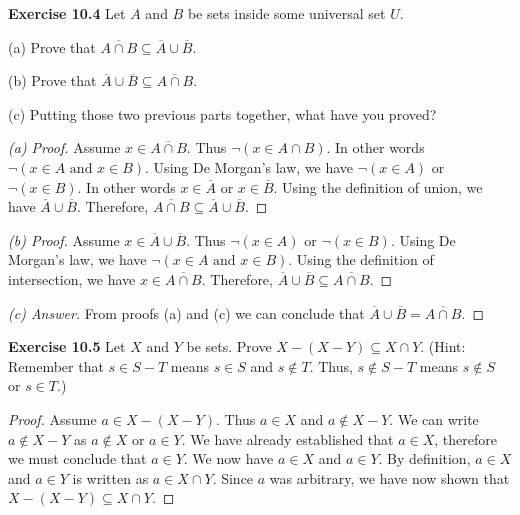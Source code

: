 \documentclass[12pt,oneside]{article}
\newenvironment{exercise}[1]{\vspace{.1in}\noindent\textbf{Exercise #1 \hspace{.05em}}}{}
\begin{document}

\begin{exercise}{10.4}
Let $A$ and $B$ be sets inside some universal set $U$.

(a) Prove that $\overline{A \cap B} \subseteq \overline{A} \cup \overline{B}$.

(b) Prove that $\overline{A} \cup \overline{B} \subseteq \overline{A \cap B}$.

(c) Putting those two previous parts together, what have you proved?
\end{exercise}

\begin{proof}[(a) Proof]
Assume $x \in \overline{A \cap B}$. Thus $\lnot (x \in A \cap B)$. In other words $\lnot (x \in A \text{ and } x \in B)$. Using De Morgan's law, we have $\lnot (x \in A)$ or $\lnot (x \in B)$. In other words $x \in \overline{A}$ or $x \in \overline{B}$. Using the definition of union, we have $\overline{A} \cup \overline{B}$. Therefore, $\overline{A \cap B} \subseteq \overline{A} \cup \overline{B}$.
\end{proof}

\begin{proof}[(b) Proof]
Assume $x \in \overline{A} \cup \overline{B}$. Thus $\lnot (x \in A)$ or $\lnot (x \in B)$. Using De Morgan's law, we have $\lnot (x \in A \text{ and } x \in B)$. Using the definition of intersection, we have $x \in \overline{A \cap B}$. Therefore, $\overline{A} \cup \overline{B} \subseteq \overline{A \cap B}$.
\end{proof}

\begin{proof}[(c) Answer]
From proofs (a) and (c) we can conclude that $\overline{A} \cup \overline{B} = \overline{A \cap B}$.
\end{proof}



\begin{exercise}{10.5}
Let $X$ and $Y$ be sets. Prove $X - (X - Y) \subseteq X \cap Y$. (Hint: Remember that $s \in S - T$ means $s \in S$ and $s \notin T$. Thus, $s \notin S - T$ means $s \notin S$ or $s \in T$.)
\end{exercise}

\begin{proof}
Assume $a \in X - (X - Y)$. Thus $a \in X$ and $a \notin X - Y$. We can write $a \notin X - Y$ as $a \notin X$ or $a \in Y$. We have already established that $a \in X$, therefore we must conclude that $a \in Y$. We now have $a \in X$ and $a \in Y$. By definition, $a \in X$ and $a \in Y$ is written as $a \in X \cap Y$. Since $a$ was arbitrary, we have now shown that $X - (X - Y) \subseteq X \cap Y$.
\end{proof}
\end{document}
